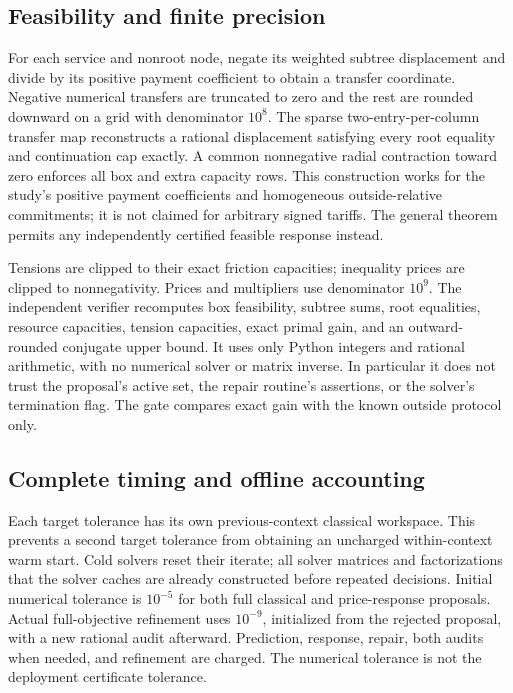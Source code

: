 \subsection{Feasibility and finite precision}
For each service and nonroot node, negate its weighted subtree displacement and divide by its positive payment coefficient to obtain a transfer coordinate. Negative numerical transfers are truncated to zero and the rest are rounded downward on a grid with denominator $10^8$. The sparse two-entry-per-column transfer map reconstructs a rational displacement satisfying every root equality and continuation cap exactly. A common nonnegative radial contraction toward zero enforces all box and extra capacity rows. This construction works for the study's positive payment coefficients and homogeneous outside-relative commitments; it is not claimed for arbitrary signed tariffs. The general theorem permits any independently certified feasible response instead.

Tensions are clipped to their exact friction capacities; inequality prices are clipped to nonnegativity. Prices and multipliers use denominator $10^9$. The independent verifier recomputes box feasibility, subtree sums, root equalities, resource capacities, tension capacities, exact primal gain, and an outward-rounded conjugate upper bound. It uses only Python integers and rational arithmetic, with no numerical solver or matrix inverse. In particular it does not trust the proposal's active set, the repair routine's assertions, or the solver's termination flag. The gate compares exact gain with the known outside protocol only.

\subsection{Complete timing and offline accounting}
Each target tolerance has its own previous-context classical workspace. This prevents a second target tolerance from obtaining an uncharged within-context warm start. Cold solvers reset their iterate; all solver matrices and factorizations that the solver caches are already constructed before repeated decisions. Initial numerical tolerance is $10^{-5}$ for both full classical and price-response proposals. Actual full-objective refinement uses $10^{-9}$, initialized from the rejected proposal, with a new rational audit afterward. Prediction, response, repair, both audits when needed, and refinement are charged. The numerical tolerance is not the deployment certificate tolerance.

